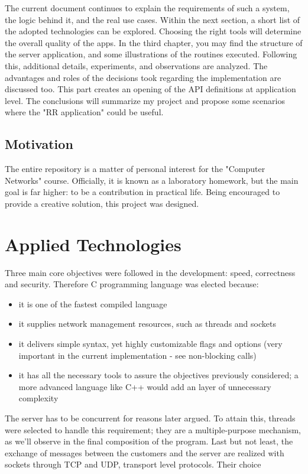 \documentclass[runningheads]{llncs}
\begin{document}
The current document continues to explain the requirements of such a system, the logic behind it, and the real use cases. Within the next section, a short list of the adopted technologies can be explored. Choosing the right tools will determine the overall quality of the apps. In the third chapter, you may find the structure of the server application, and some illustrations of the routines executed. Following this, additional details, experiments, and observations are analyzed. The advantages and roles of the decisions took regarding the implementation are discussed too. This part creates an opening of the API definitions at application level. The conclusions will summarize my project and propose some scenarios where the "RR application" could be useful.

\subsection{Motivation}

The entire repository is a matter of personal interest for the "Computer Networks" course. Officially, it is known as a laboratory homework, but the main goal is far higher: to be a contribution in practical life. Being encouraged to provide a creative solution, this project was designed.

\section{Applied Technologies}

Three main core objectives were followed in the development: speed, correctness and security. Therefore C programming language was elected because:
\begin{itemize}
    \item it is one of the fastest compiled language 
    \item it supplies network management resources, such as threads and sockets
    \item it delivers simple syntax, yet highly customizable flags and options (very important in the current implementation - see non-blocking calls)
    \item it has all the necessary tools to assure the objectives previously considered; a more advanced language like C++ would add an layer of unnecessary complexity
\end{itemize}

The server has to be concurrent for reasons later argued. To attain this, threads were selected to handle this requirement; they are a multiple-purpose mechanism, as we'll observe in the final composition of the program. Last but not least, the exchange of messages between the customers and the server are realized with sockets through TCP and UDP, transport level protocols. Their choice 
\end{document}
